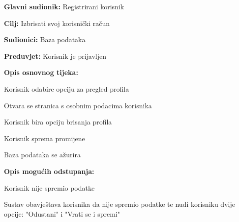 				\noindent {}
					\begin{packed_item}
	
						\item \textbf{Glavni sudionik: }Registrirani korisnik
						\item  \textbf{Cilj:} Izbrisati svoj korisnički račun
						\item  \textbf{Sudionici:} Baza podataka
						\item  \textbf{Preduvjet:} Korisnik je prijavljen
						\item  \textbf{Opis osnovnog tijeka:}
						
						\item[] \begin{packed_enum}
	
							\item Korisnik odabire opciju za pregled profila
							\item Otvara se stranica s osobnim podacima korisnika
							\item Korisnik bira opciju brisanja profila
							\item Korisnik sprema promijene
							\item Baza podataka se ažurira

						\end{packed_enum}
						
						\item  \textbf{Opis mogućih odstupanja:}
						
						\item[] \begin{packed_item}
								
							\item[4.a] Korisnik nije spremio podatke
								\begin{packed_item}
									\item Sustav obavještava korisnika da nije spremio podatke te nudi korisniku dvije opcije: "Odustani" i "Vrati se i spremi"
								\end{packed_item}
								
								
						\end{packed_item}						
					\end{packed_item}
					
